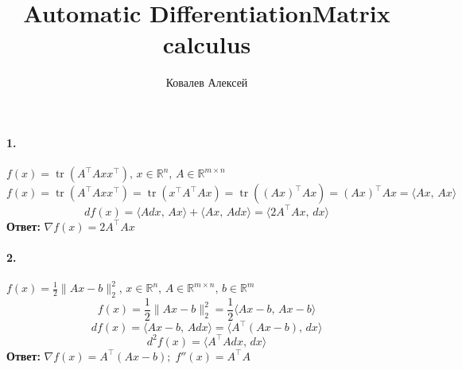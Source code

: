 \documentclass{article}
\title{Automatic Differentiation}
\title{Matrix calculus}
\author{Ковалев Алексей}
\date{}
\DeclareMathOperator{\tr}{tr}
\newcommand*{\R}{\mathbb{R}}
\begin{document}
\maketitle

\paragraph{1.} $f(x) = \tr(A^{\top} A x x^{\top}),\, x \in \R^n,\, A \in \R^{m \times n}$
\[ f(x) = \tr(A^{\top} A x x^{\top}) = \tr(x^{\top} A^{\top} A x) = \tr((Ax)^{\top} Ax) = (Ax)^{\top} Ax = \langle Ax,\, Ax \rangle \]
\[ df(x) =  \langle Adx,\, Ax \rangle + \langle Ax,\, Adx \rangle = \langle 2 A^{\top} A x,\, dx \rangle \]
\textbf{Ответ:} $ \nabla f(x) = 2 A^{\top} A x $


\paragraph{2.} $f(x) = \frac{1}{2} \| Ax - b \|_2^2,\, x \in \R^n,\, A \in \R^{m \times n},\, b \in \R^{m}$
\[ f(x) = \frac{1}{2} \| Ax - b \|_2^2 = \frac{1}{2} \langle Ax - b,\, Ax - b \rangle \]
\[ df(x) = \langle Ax - b,\, Adx \rangle = \langle A^{\top} (Ax - b),\, dx \rangle \]
\[ d^2 f(x) = \langle A^{\top} A dx,\, dx \rangle \]
\textbf{Ответ:} $\nabla f(x) = A^{\top} (Ax - b);\; f''(x) = A^{\top} A$
\end{document}

